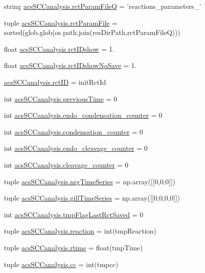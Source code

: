 \begin{DoxyCompactItemize}
string \hyperlink{a00102_aff5ea475bb2c78122a231a915dc88e89}{acs\-S\-C\-Canalysis.\-rct\-Param\-File\-Q} = 'reactions\-\_\-parameters\-\_\-'
\item 
tuple \hyperlink{a00102_ac700504fc38d7684ec9fae104d7d90a3}{acs\-S\-C\-Canalysis.\-rct\-Param\-File} = sorted(glob.\-glob(os.\-path.\-join(res\-Dir\-Path,rct\-Param\-File\-Q)))
\item 
float \hyperlink{a00102_a8a780c7762bc8a40f296abfd474b7ce4}{acs\-S\-C\-Canalysis.\-rct\-I\-Dshow} = 1.
\item 
float \hyperlink{a00102_a3942b0b71d5893c244f7f49929db336b}{acs\-S\-C\-Canalysis.\-rct\-I\-Dshow\-No\-Save} = 1.
\item 
\hyperlink{a00102_a78ffc7d3b69c53ec5389a151e7fdcb83}{acs\-S\-C\-Canalysis.\-rct\-I\-D} = init\-Rct\-Id
\item 
int \hyperlink{a00102_aff96a31e98ac46cb47a67b74f5d87351}{acs\-S\-C\-Canalysis.\-previous\-Time} = 0
\item 
int \hyperlink{a00102_a20a51ec68106a5a97fb3a72f417ca4e6}{acs\-S\-C\-Canalysis.\-endo\-\_\-condensation\-\_\-counter} = 0
\item 
int \hyperlink{a00102_a144441bdbe6e835849cf165ea2946848}{acs\-S\-C\-Canalysis.\-condensation\-\_\-counter} = 0
\item 
int \hyperlink{a00102_af5702a39b502da88dde8c38417a0efbd}{acs\-S\-C\-Canalysis.\-endo\-\_\-cleavage\-\_\-counter} = 0
\item 
int \hyperlink{a00102_a0dd6730b063ac11ae4620c4a0778f6d9}{acs\-S\-C\-Canalysis.\-cleavage\-\_\-counter} = 0
\item 
tuple \hyperlink{a00102_ad4d4abc783f2f7f8d1084b1144b4fe2f}{acs\-S\-C\-Canalysis.\-nrg\-Time\-Series} = np.\-array(\mbox{[}\mbox{[}0,0,0\mbox{]}\mbox{]})
\item 
tuple \hyperlink{a00102_a99669fe823cebc560b46c3746f9183e7}{acs\-S\-C\-Canalysis.\-gill\-Time\-Series} = np.\-array(\mbox{[}\mbox{[}0,0,0,0\mbox{]}\mbox{]})
\item 
int \hyperlink{a00102_a6e8aff976901d1424dd1ff00c3387014}{acs\-S\-C\-Canalysis.\-tmp\-Flag\-Last\-Rct\-Saved} = 0
\item 
tuple \hyperlink{a00102_a58c3618ec28f27dfbf09e0d3aba05bc7}{acs\-S\-C\-Canalysis.\-reaction} = int(tmp\-Reaction)
\item 
tuple \hyperlink{a00102_a162a08b0497058c76e7e885c03a01336}{acs\-S\-C\-Canalysis.\-rtime} = float(tmp\-Time)
\item 
tuple \hyperlink{a00102_a67fcb77a15f51e94c98bb48b05865715}{acs\-S\-C\-Canalysis.\-cc} = int(tmpcc)

\end{DoxyCompactItemize}
